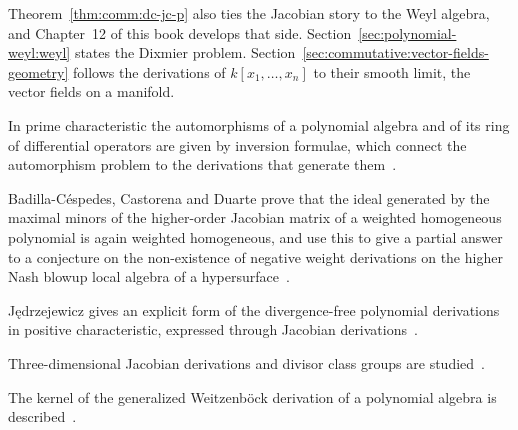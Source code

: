 Theorem~\ref{thm:comm:dc-jc-p} also ties the Jacobian story to the Weyl
algebra, and Chapter~12 of this book develops that side.
Section~\ref{sec:polynomial-weyl:weyl} states the Dixmier problem.
Section~\ref{sec:commutative:vector-fields-geometry} follows the derivations
of $k[x_1,\dots,x_n]$ to their smooth limit, the vector fields on a manifold.

In prime characteristic the automorphisms of a polynomial algebra and of its ring of differential operators are given by inversion formulae, which connect the automorphism problem to the derivations that generate them~\cite{WlTheInversionFormulae2008}.

Badilla-C\'espedes, Castorena and Duarte prove that the ideal generated by the maximal minors of the higher-order Jacobian matrix of a weighted homogeneous polynomial is again weighted homogeneous, and use this to give a partial answer to a conjecture on the non-existence of negative weight derivations on the higher Nash blowup local algebra of a hypersurface~\cite{WlHigherJacobianMatrixOfWeighted2025}.

J\k{e}drzejewicz gives an explicit form of the divergence-free polynomial derivations in positive characteristic, expressed through Jacobian derivations~\cite{WlANoteOnDivergenceFreePolynomia2019}.

Three-dimensional Jacobian derivations and divisor class groups are studied~\cite{WlThreeDimensionalJacobianDeriva2020}.

The kernel of the generalized Weitzenb\"ock derivation of a polynomial algebra is described~\cite{WlKernelOfGeneralizedWeitzenbCkS2020}.
